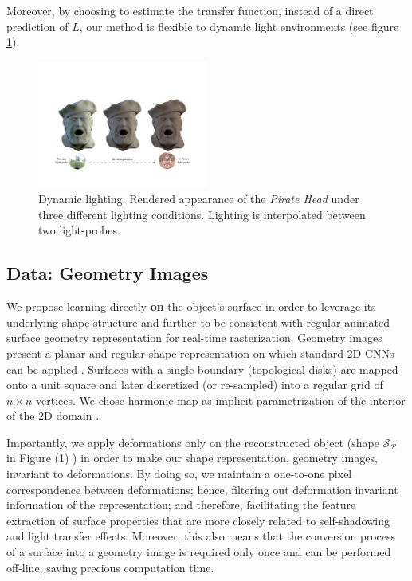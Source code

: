Moreover, by choosing to estimate the transfer function, instead of a direct prediction of $L$, our method is flexible to dynamic light environments (see figure \ref{Fig: Varying lighting}).
\begin{figure}[H]
  \centering
    \includegraphics[width=0.5\textwidth]{Figures/varying_lighting}
     \caption{Dynamic lighting. Rendered appearance of the \textit{Pirate Head} under three different  lighting conditions. Lighting is interpolated between two light-probes.}
     \label{Fig: Varying lighting}
\end{figure}
\subsection{Data: Geometry Images}
We propose learning directly \textbf{on} the object's surface in order to leverage its underlying shape structure and further to be consistent with regular animated surface geometry representation for real-time rasterization. Geometry images present a planar and regular shape representation on which standard 2D CNNs can be applied \cite{gu2002geometry, sinha2016deep}. Surfaces with a single boundary (topological disks) are mapped onto a unit square and later discretized (or re-sampled) into a regular grid of $n \times n$ vertices. We chose harmonic map as implicit parametrization of the interior of the 2D domain \cite{HM_book, HarmonicMapping}. 

Importantly, we apply deformations only on the reconstructed object (shape $\mathcal{S_R}$ in Figure (1) ) in order to make our shape representation, geometry images, invariant to deformations. By doing so, we maintain a one-to-one pixel correspondence between deformations; hence, filtering out deformation invariant information of the representation; and therefore, facilitating the feature extraction of surface properties that are more closely related to self-shadowing and light transfer effects. Moreover, this also means that the conversion process of a surface into a geometry image is required only once and can be performed off-line, saving precious computation time.


